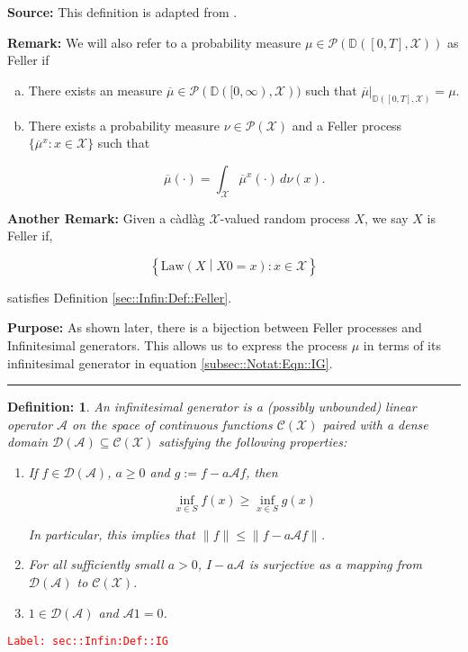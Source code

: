 \documentclass[12pt]{article}
\newcommand{\mb}{\mathbb}
\newcommand{\mc}{\mathcal}
\newcommand{\ov}{\overline}
\newcommand{\te}{\text}
\newcommand{\tr}{\textcolor{red}}
\newcommand{\labe}[1]{\tr{\texttt{Label: #1}}}
\newcommand{\purpose}{\textbf{Purpose: }}
\newcommand{\lin}{\rule{\linewidth}{0.4 pt}}
\newcommand{\cad}{\mb{D}}							%
\newcommand{\x}{x}								%
\newcommand{\X}{X}								%
\newcommand{\IG}{\mc{A}}						%
\newcommand{\law}{\te{Law}}							%
\newtheorem{defn}[thms]{Definition: }
\begin{document}
\textbf{Source: } This definition is adapted from \cite[Definition 1.1,1.2]{Lig85}.

\textbf{Remark: } We will also refer to a probability measure \(\mu \in \mc{P}(\cad([0,T],\mc{X}))\) as Feller if

\begin{enumerate}[(a)]
\item There exists an measure \(\ov{\mu}\in \mc{P}(\cad([0,\infty),\mc{X}))\) such that \(\ov{\mu}|_{\cad([0,T],\mc{X})} = \mu\).

\item There exists a probability measure \(\nu\in \mc{P}(\mc{X})\) and a Feller process \(\{\ov{\mu}^x:x \in \mc{X}\}\) such that 

\[\ov{\mu}(\cdot) = \int_{\mc{X}} \ov{\mu}^x(\cdot)\,d\nu(x).\]
\end{enumerate}

\textbf{Another Remark: } Given a c\`adl\`ag \(\mc{X}\)-valued random process \(\X{}{}\), we say \(\X{}{}\) is Feller if,

\[\left\{\law\left(\X{}{}\middle|\X{}{0} = \x{}{}\right): \x{}{} \in \mc{X}\right\}\]

satisfies Definition \ref{sec::Infin:Def::Feller}.

\purpose As shown later, there is a bijection between Feller processes and Infinitesimal generators. This allows us to express the process \(\mu\) in terms of its infinitesimal generator in equation \eqref{subsec::Notat:Eqn::IG}.

\lin

\begin{defn}
An infinitesimal generator is a (possibly unbounded) linear operator \(\IG{}\) on the space of continuous functions \(\mc{C}(\mc{X})\) paired with a dense domain \(\mc{D}(\IG{}) \subseteq \mc{C}(\mc{X})\) satisfying the following properties:

\begin{enumerate}
\item If \(f \in \mc{D}(\IG{})\), \(a \geq 0\) and \(g:= f - a\IG{} f\), then 

\[\inf_{x \in S} f(x) \geq \inf_{x \in S} g(x)\]

\noindent In particular, this implies that \(\|f\| \leq \|f - a\IG{} f\|\).

\item For all sufficiently small \(a > 0\), \(I - a\IG{}\) is surjective as a mapping from \(\mc{D}(\IG{})\) to \(\mc{C}(\mc{X})\).

\item \(1 \in \mc{D}(\IG{})\) and \(\IG{} 1 = 0\).
\end{enumerate}
\label{sec::Infin:Def::IG}
\end{defn}
\labe{sec::Infin:Def::IG}
\end{document}
